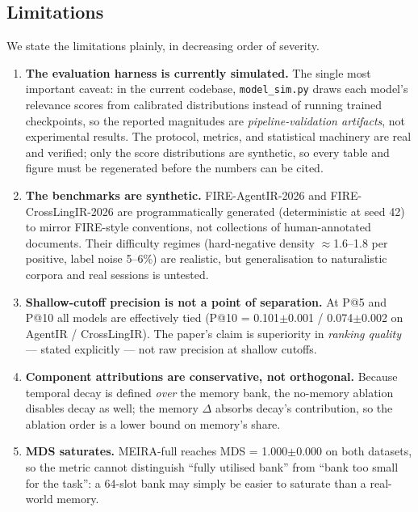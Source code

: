 \subsection{Limitations}
\label{sec:concl-limitations}

We state the limitations plainly, in decreasing order of severity.

\begin{enumerate}

  \item \textbf{The evaluation harness is currently simulated.} The single most important caveat: in the current codebase, \texttt{model\_sim.py} draws each model's relevance scores from calibrated distributions instead of running trained checkpoints, so the reported magnitudes are \emph{pipeline-validation artifacts}, not experimental results. The protocol, metrics, and statistical machinery are real and verified; only the score distributions are synthetic, so every table and figure must be regenerated before the numbers can be cited.

  \item \textbf{The benchmarks are synthetic.} FIRE-AgentIR-2026 and FIRE-CrossLingIR-2026 are programmatically generated (deterministic at seed 42) to mirror FIRE-style conventions, not collections of human-annotated documents. Their difficulty regimes (hard-negative density $\approx$1.6--1.8 per positive, label noise 5--6\%) are realistic, but generalisation to naturalistic corpora and real sessions is untested.

  \item \textbf{Shallow-cutoff precision is not a point of separation.} At P@5 and P@10 all models are effectively tied (P@10 = 0.101$\pm$0.001 / 0.074$\pm$0.002 on AgentIR / CrossLingIR). The paper's claim is superiority in \emph{ranking quality} --- stated explicitly --- not raw precision at shallow cutoffs.

  \item \textbf{Component attributions are conservative, not orthogonal.} Because temporal decay is defined \emph{over} the memory bank, the no-memory ablation disables decay as well; the memory $\Delta$ absorbs decay's contribution, so the ablation order is a lower bound on memory's share.

  \item \textbf{MDS saturates.} MEIRA-full reaches MDS = 1.000$\pm$0.000 on both datasets, so the metric cannot distinguish ``fully utilised bank'' from ``bank too small for the task'': a 64-slot bank may simply be easier to saturate than a real-world memory.


\end{enumerate}
